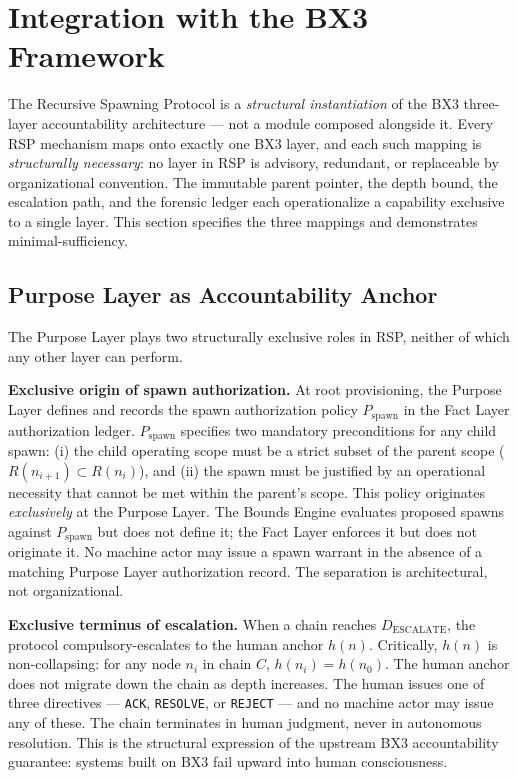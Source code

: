 \section{Integration with the BX3 Framework}
\label{sec:rs-integration}

The Recursive Spawning Protocol is a \emph{structural instantiation} of the BX3 three-layer accountability architecture — not a module composed alongside it. Every RSP mechanism maps onto exactly one BX3 layer, and each such mapping is \emph{structurally necessary}: no layer in RSP is advisory, redundant, or replaceable by organizational convention. The immutable parent pointer, the depth bound, the escalation path, and the forensic ledger each operationalize a capability exclusive to a single layer. This section specifies the three mappings and demonstrates minimal-sufficiency.

\subsection{Purpose Layer as Accountability Anchor}
\label{sec:rs-purpose-anchor}

The Purpose Layer plays two structurally exclusive roles in RSP, neither of which any other layer can perform.

\medskip
\noindent\textbf{Exclusive origin of spawn authorization.}
At root provisioning, the Purpose Layer defines and records the spawn authorization policy $P_{\mathrm{spawn}}$ in the Fact Layer authorization ledger. $P_{\mathrm{spawn}}$ specifies two mandatory preconditions for any child spawn: (i) the child operating scope must be a strict subset of the parent scope ($R(n_{i+1}) \subset R(n_i)$), and (ii) the spawn must be justified by an operational necessity that cannot be met within the parent's scope. This policy originates \emph{exclusively} at the Purpose Layer. The Bounds Engine evaluates proposed spawns against $P_{\mathrm{spawn}}$ but does not define it; the Fact Layer enforces it but does not originate it. No machine actor may issue a spawn warrant in the absence of a matching Purpose Layer authorization record. The separation is architectural, not organizational.

\medskip
\noindent\textbf{Exclusive terminus of escalation.}
When a chain reaches $D_{\mathrm{ESCALATE}}$, the protocol compulsory-escalates to the human anchor $h(n)$. Critically, $h(n)$ is non-collapsing: for any node $n_i$ in chain $C$, $h(n_i) = h(n_0)$. The human anchor does not migrate down the chain as depth increases. The human issues one of three directives — \texttt{ACK}, \texttt{RESOLVE}, or \texttt{REJECT} — and no machine actor may issue any of these. The chain terminates in human judgment, never in autonomous resolution. This is the structural expression of the upstream BX3 accountability guarantee: systems built on BX3 fail upward into human consciousness.

